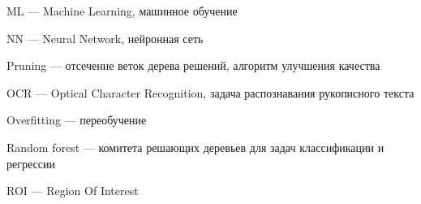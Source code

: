 \documentclass[a4paper,14pt]{extarticle} %
\begin{document}
\noindent ML --- Machine Learning, машинное обучение

\noindent NN --- Neural Network, нейронная сеть

\noindent Pruning --- отсечение веток дерева решений, алгоритм улучшения качества

\noindent OCR --- Optical Character Recognition, задача распознавания рукописного текста

\noindent Overfitting --- переобучение 

\noindent Random forest --- комитета решающих деревьев для задач классификации и регрессии

\noindent ROI --- Region Of Interest 

\newpage
\begin{flushleft}
\end{flushleft}
\end{document}
